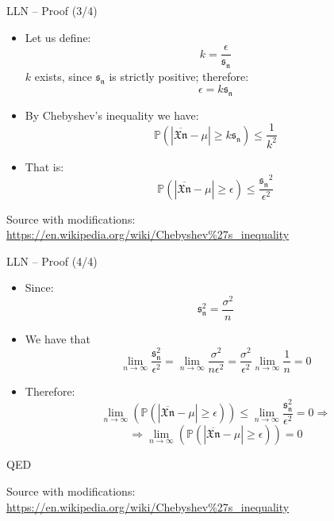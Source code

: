 \documentclass{beamer}
\begin{document}
\begin{frame}
{\centerline{LLN -- Proof (3/4)}}

\begin{itemize}
\item Let us define:\\
$$k = \frac{\epsilon}{\mathfrak{s_n}}$$
$k$ exists, since $\mathfrak{s_n}$ is strictly positive; therefore:
$$\epsilon = k\mathfrak{s_n}$$
\item By Chebyshev's inequality we have:
$$\mathbb{P} ( |\overline{\mathfrak{Xn}} - \mu|  \geq k\mathfrak{s_n}) \leq  \frac{1}{k^2}$$
\item That is:
$$\mathbb{P} ( |\overline{\mathfrak{Xn}} - \mu|  \geq \epsilon) \leq  \frac{\mathfrak{s_n}^2}{\epsilon^2}$$

\end{itemize}


\begin{center}
\tiny 
Source with modifications: \url{https://en.wikipedia.org/wiki/Chebyshev\%27s_inequality}
\end{center}
\end{frame}


\begin{frame}
{\centerline{LLN -- Proof (4/4)}}

\begin{itemize}

\item Since:
$$  \mathfrak{s_n^2} = \frac{\sigma^2}{n} $$
\item We have that
$$ \lim_{n \to \infty} \frac{\mathfrak{s_n^2}}{\epsilon^2}
= \lim_{n \to \infty} \frac{\sigma^2}{n\epsilon^2}
= \frac{\sigma^2}{\epsilon^2} \lim_{n \to \infty} \frac{1}{n}
= 0$$
\item Therefore:
$$  \lim_{n \to \infty} \left ( \mathbb{P} ( |\overline{\mathfrak{Xn}} - \mu| \geq \epsilon) \right ) \leq  \lim_{n \to \infty} \frac{\mathfrak{s_n^2}}{\epsilon^2} = 0 
\Rightarrow $$
$$ \Rightarrow \lim_{n \to \infty} \left ( \mathbb{P} ( |\overline{\mathfrak{Xn}} - \mu| \geq \epsilon) \right ) = 0 $$
\end{itemize} 
QED



\begin{center}
\tiny 
Source with modifications: \url{https://en.wikipedia.org/wiki/Chebyshev\%27s_inequality}
\end{center}
\end{frame}
\end{document}
